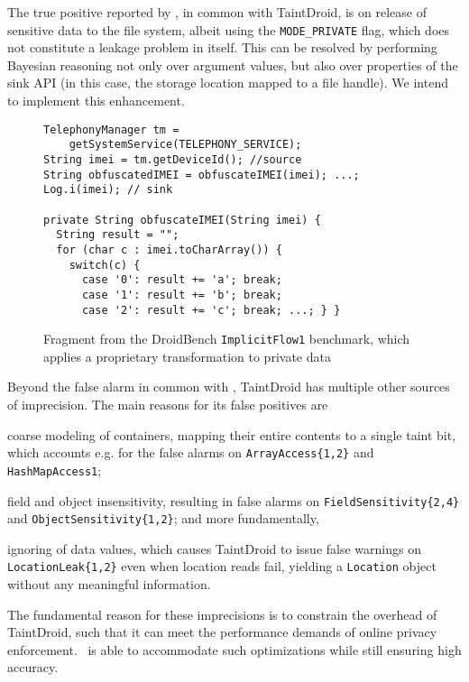 The true positive reported by \Tool, in common with TaintDroid, is on release of sensitive data to the file system, albeit using the {\tt MODE\_PRIVATE} flag, which does not constitute a leakage problem in itself. This can be resolved by performing Bayesian reasoning not only over argument values, but also over properties of the sink API (in this case, the storage location mapped to a file handle). We intend to implement this enhancement.

\begin{figure}
\begin{lstlisting}
TelephonyManager tm =
    getSystemService(TELEPHONY_SERVICE);
String imei = tm.getDeviceId(); //source
String obfuscatedIMEI = obfuscateIMEI(imei); ...;
Log.i(imei); // sink

private String obfuscateIMEI(String imei) {
  String result = "";
  for (char c : imei.toCharArray()) {
    switch(c) {
      case '0': result += 'a'; break;
      case '1': result += 'b'; break;
      case '2': result += 'c'; break; ...; } }
\end{lstlisting}
\caption{\label{Fi:dataTransform} Fragment from the DroidBench {\tt ImplicitFlow1} benchmark, which applies a proprietary transformation to private data}
\end{figure}


Beyond the false alarm in common with \Tool, TaintDroid has multiple other sources of imprecision. The main reasons for its false positives are
\begin{compactitem}
	\item coarse modeling of containers, mapping their entire contents to a single taint bit, which accounts e.g. for the false alarms on {\tt ArrayAccess\{1,2\}} and {\tt HashMapAccess1};
	\item field and object insensitivity, resulting in false alarms on {\tt FieldSensitivity\{2,4\}} and {\tt ObjectSensitivity\{1,2\}}; and more fundamentally,
	\item ignoring of data values, which causes TaintDroid to issue false warnings on {\tt LocationLeak\{1,2\}} even when location reads fail, yielding a {\tt Location} object without any meaningful information.
\end{compactitem}
The fundamental reason for these imprecisions is to constrain the overhead of TaintDroid, such that it can meet the performance demands of online privacy enforcement. \Tool\ is able to accommodate such optimizations while still ensuring high accuracy. 
